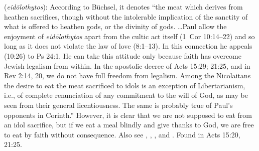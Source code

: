 \item[Idol meat,]

(\textit{eidōlothytos}):
According to Büchsel, it denotes ``the meat which derives from heathen sacrifices, though without the intolerable implication of the sanctity of what is offered to heathen gods, or the divinity of gods. \ldots Paul allow the enjoyment of \emph{eidōlothytos} apart from the cultic act itself (1~Cor 10:14--22) and so long as it does not violate the law of love (8:1--13). In this connection he appeals (10:26) to Ps 24:1. He can take this attitude only because faith has overcome Jewish legalism from within. In the apostolic decree of Acts 15:29; 21:25, and in Rev 2:14, 20, we do not have full freedom from legalism. Among the Nicolaitans the desire to eat the meat sacrificed to idols is an exception of Libertarianism, i.e., of complete renunciation of any commitment to the will of God, as may be seen from their general licentiousness. The same is probably true of Paul's opponents in Corinth.'' 
However, it is clear that we are not supposed to eat from an idol sacrifice, but if we eat a meal blindly and give thanks to God, we are free to eat by faith without consequence. Also see , , , and .
Found in Acts 15:20, 21:25.
